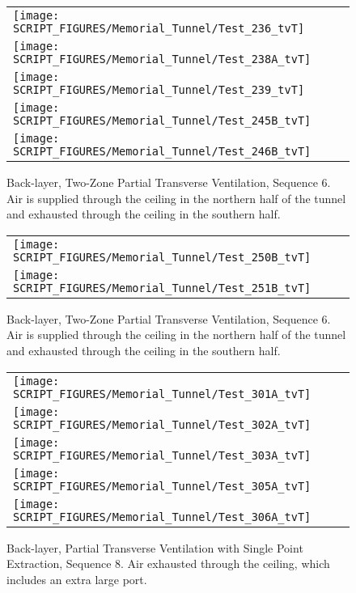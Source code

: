 \begin{figure}[p]
\begin{tabular*}{\textwidth}{l}
\texttt{[image: SCRIPT\_FIGURES/Memorial\_Tunnel/Test\_236\_tvT]} \\
\texttt{[image: SCRIPT\_FIGURES/Memorial\_Tunnel/Test\_238A\_tvT]} \\
\texttt{[image: SCRIPT\_FIGURES/Memorial\_Tunnel/Test\_239\_tvT]} \\
\texttt{[image: SCRIPT\_FIGURES/Memorial\_Tunnel/Test\_245B\_tvT]} \\
\texttt{[image: SCRIPT\_FIGURES/Memorial\_Tunnel/Test\_246B\_tvT]}
\end{tabular*}
\caption[Back-layer, Two-Zone Partial Transverse Ventilation, Sequence 6]{Back-layer, Two-Zone Partial Transverse Ventilation, Sequence 6. Air is supplied through the ceiling in the northern half of the tunnel and exhausted through the ceiling in the southern half.}
\label{Memorial_Tunnel_Seq_6b}
\end{figure}

\begin{figure}[p]
\begin{tabular*}{\textwidth}{l}
\texttt{[image: SCRIPT\_FIGURES/Memorial\_Tunnel/Test\_250B\_tvT]} \\
\texttt{[image: SCRIPT\_FIGURES/Memorial\_Tunnel/Test\_251B\_tvT]}
\end{tabular*}
\caption[Back-layer, Two-Zone Partial Transverse Ventilation, Sequence 6]{Back-layer, Two-Zone Partial Transverse Ventilation, Sequence 6. Air is supplied through the ceiling in the northern half of the tunnel and exhausted through the ceiling in the southern half.}
\label{Memorial_Tunnel_Seq_6c}
\end{figure}

\begin{figure}[p]
\begin{tabular*}{\textwidth}{l}
\texttt{[image: SCRIPT\_FIGURES/Memorial\_Tunnel/Test\_301A\_tvT]} \\
\texttt{[image: SCRIPT\_FIGURES/Memorial\_Tunnel/Test\_302A\_tvT]} \\
\texttt{[image: SCRIPT\_FIGURES/Memorial\_Tunnel/Test\_303A\_tvT]} \\
\texttt{[image: SCRIPT\_FIGURES/Memorial\_Tunnel/Test\_305A\_tvT]} \\
\texttt{[image: SCRIPT\_FIGURES/Memorial\_Tunnel/Test\_306A\_tvT]}
\end{tabular*}
\caption[Back-layer, Partial Transverse Ventilation with Single Point Extraction, Sequence 8]{Back-layer, Partial Transverse Ventilation with Single Point Extraction, Sequence 8. Air exhausted through the ceiling, which includes an extra large port.}
\label{Memorial_Tunnel_Seq_8a}
\end{figure}

